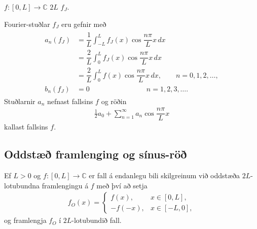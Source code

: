\documentclass[a4paper,10pt,icelandic]{sphinxmanual}
\begin{document}

 \(f:[0,L]\to \mathbb{C}\)  \(2L\)  \(f_J\).

Fourier-stuðlar \(f_J\) eru gefnir með
\begin{equation*}
\begin{split}\begin{aligned}
 a_n(f_J)&=\dfrac 1L \int_{-L}^L f_J(x)\cos \dfrac {n\pi}L
 x \, dx\\
 &=\dfrac 2L \int_{0}^L f_J(x)\cos \dfrac {n\pi}L
 x \, dx\\
 &=\dfrac 2L \int_{0}^L f(x)\cos\dfrac {n\pi}L
 x \, dx, \qquad n=0,1,2,\dots,\\
 b_n(f_J)&=0 \qquad \qquad \qquad\qquad n=1,2,3,\dots.\end{aligned}\end{split}
\end{equation*}
Stuðlarnir \(a_n\) nefnast  fallsins \(f\) og röðin
\begin{equation*}
\begin{split}\tfrac 12 a_0 + \sum_{n=1}^\infty a_n \cos  \dfrac {n\pi} L x\end{split}
\end{equation*}
kallast  fallsins \(f\).


\subsection{Oddstæð framlenging og sínus-röð}
\label{\detokenize{Kafli02:oddstae-framlenging-og-sinus-ro}}
Ef \(L>0\) og \(f: [0,L]\to \mathbb{C}\) er fall á endanlegu bili skilgreinum við oddstæða \(2L\)-lotubundna framlengingu á \(f\) með því að setja
\begin{equation*}
\begin{split}f_O(x)=\begin{cases} f(x), & x\in [0,L],\\  -f(-x), & x\in
  [-L,0],\end{cases}\end{split}
\end{equation*}
og framlengja \(f_O\) í \(2L\)-lotubundið fall.
\end{document}
